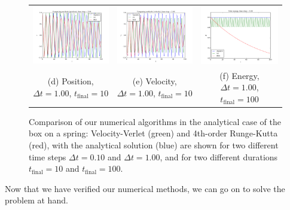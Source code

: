 \documentclass{article}
\begin{document}
\begin{multicols}{2}
\begin{figure}
\begin{center}
\begin{tabular}{ccc}
	\includegraphics[width=60mm]{Images/comparison_x_1.png} 
	& \includegraphics[width=60mm]{Images/comparison_v_1.png}
	& \includegraphics[width=60mm]{Images/comparison_E_1.png} \\
	(d) Position, $\Delta t = 1.00$, $t_{\mathrm{final}} = 10$ 		& (e) Velocity, $\Delta t = 1.00$, $t_{\mathrm{final}} = 10$		& (f) Energy, $\Delta t = 1.00$, $t_{\mathrm{final}} = 100$  \\[6pt]
\end{tabular}
\caption{Comparison of our numerical algorithms in the analytical case of the box on a spring: Velocity-Verlet (green) and 4th-order Runge-Kutta (red), with the analytical solution (blue) are shown for two different time steps $\Delta t = 0.10$ and $\Delta t = 1.00$, and for two different durations $t_{\mathrm{final}} = 10$ and $t_{\mathrm{final}} = 100$.}\label{fig:analytical}
\end{center}
\end{figure}


\noindent Now that we have verified our numerical methods, we can go on to solve the problem at hand.




\end{multicols}
\end{document}
